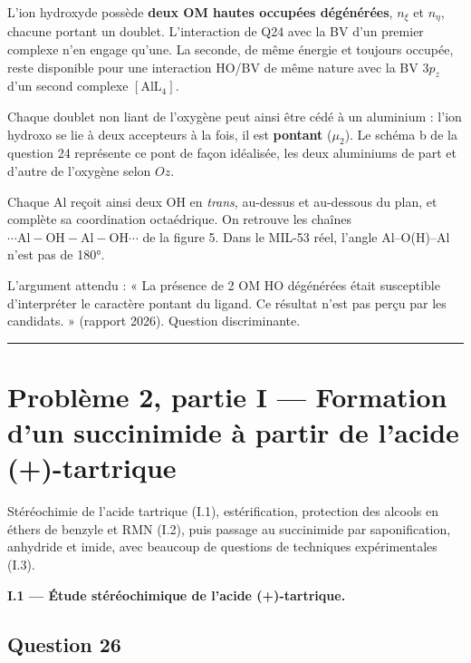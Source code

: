 \documentclass[11pt,a4paper]{article}
\begin{document}
L'ion hydroxyde possède \textbf{deux OM hautes occupées dégénérées}, \(n_\xi\) et \(n_\eta\), chacune portant un doublet. L'interaction de Q24 avec la BV d'un premier complexe n'en engage qu'une. La seconde, de même énergie et toujours occupée, reste disponible pour une interaction HO/BV de même nature avec la BV \(3p_z\) d'un second complexe \([\mathrm{AlL_4}]\).

Chaque doublet non liant de l'oxygène peut ainsi être cédé à un aluminium : l'ion hydroxo se lie à deux accepteurs à la fois, il est \textbf{pontant} (\(\mu_2\)). Le schéma b de la question 24 représente ce pont de façon idéalisée, les deux aluminiums de part et d'autre de l'oxygène selon \(Oz\).

Chaque Al reçoit ainsi deux OH en \emph{trans}, au-dessus et au-dessous du plan, et complète sa coordination octaédrique. On retrouve les chaînes \(\cdots\mathrm{Al{-}OH{-}Al{-}OH}\cdots\) de la figure 5. Dans le MIL-53 réel, l'angle Al--O(H)--Al n'est pas de 180°.

\begin{jury}

L'argument attendu : « La présence de 2 OM HO dégénérées était susceptible d'interpréter le caractère pontant du ligand. Ce résultat n'est pas perçu par les candidats. » (rapport 2026). Question discriminante.

\end{jury}

\begin{center}\rule{0.5\linewidth}{0.5pt}\end{center}

\hypertarget{probluxe8me-2-partie-i-formation-dun-succinimide-uxe0-partir-de-lacide--tartrique}{%
\section{Problème 2, partie I --- Formation d'un succinimide à partir de l'acide (+)-tartrique}\label{probluxe8me-2-partie-i-formation-dun-succinimide-uxe0-partir-de-lacide--tartrique}}

Stéréochimie de l'acide tartrique (I.1), estérification, protection des alcools en éthers de benzyle et RMN (I.2), puis passage au succinimide par saponification, anhydride et imide, avec beaucoup de questions de techniques expérimentales (I.3).

\textbf{I.1 --- Étude stéréochimique de l'acide (+)-tartrique.}

\hypertarget{question-26}{%
\subsection{Question 26}\label{question-26}}
\end{document}
